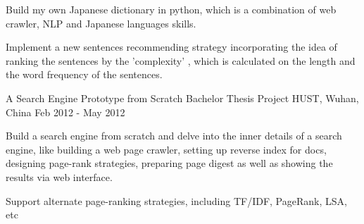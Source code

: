 \begin{cventries}
{\begin{cvitems}
        \item {Build my own Japanese dictionary in python, which is a combination of web crawler, NLP and Japanese languages skills.}
        \item {Implement a new sentences recommending strategy incorporating the idea of ranking the sentences by the 'complexity' , which is calculated  on the length and the word frequency of the sentences.}
      \end{cvitems}
    }
  \cventry
    {A Search Engine Prototype from Scratch}
    {Bachelor Thesis Project}
    {HUST, Wuhan, China}
    {Feb 2012 - May 2012}
    {
      \begin{cvitems}
        \item {Build a search engine from scratch and delve into the inner details of a search engine, like building a web page crawler, setting up reverse index for docs, designing page-rank strategies, preparing page digest as well as showing the results via web interface.}
        \item {Support alternate page-ranking strategies, including TF/IDF, PageRank, LSA, etc}
      \end{cvitems}
    }
\end{cventries}